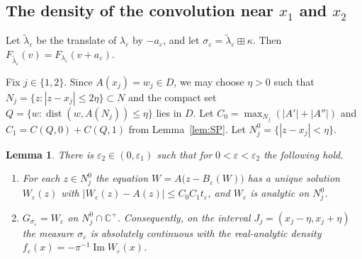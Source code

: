 \documentclass[11pt]{amsart}
\numberwithin{equation}{section}
\newtheorem{lemma}[theorem]{Lemma}
\theoremstyle{definition}
\theoremstyle{remark}
\newcommand{\Cp}{\mathbb C^{+}}
\newcommand{\dist}{\operatorname{dist}}
\renewcommand{\Im}{\operatorname{Im}}
\begin{document}
\subsection{\texorpdfstring{The density of the convolution near $x_1$ and $x_2$}{The density of the convolution near x1 and x2}}
Let $\tilde\lambda_\varepsilon$ be the translate of $\lambda_\varepsilon$ by $-a_\varepsilon$, and let $\sigma_\varepsilon=\tilde\lambda_\varepsilon\boxplus\kappa$. Then $F_{\tilde\lambda_\varepsilon}(v)=F_{\lambda_\varepsilon}(v+a_\varepsilon)$.

Fix $j\in\{1,2\}$. Since $A(x_j)=w_j\in D$, we may choose $\eta>0$ such that $N_j=\{z:|z-x_j|\le2\eta\}\subset N$ and the compact set $Q=\{w:\dist(w,A(N_j))\le\eta\}$ lies in $D$. Let $C_0=\max_{N_j}(|A'|+|A''|)$ and $C_1=C(Q,0)+C(Q,1)$ from Lemma~\ref{lem:SP}. Let $N_j^0=\{|z-x_j|<\eta\}$.

\begin{lemma}\label{lem:ident}
There is $\varepsilon_2\in(0,\varepsilon_1)$ such that for $0<\varepsilon<\varepsilon_2$ the following hold.
\begin{enumerate}
\item For each $z\in N_j^0$ the equation $W=A\bigl(z-B_\varepsilon(W)\bigr)$ has a unique solution $W_\varepsilon(z)$ with $|W_\varepsilon(z)-A(z)|\le C_0C_1t_\varepsilon$, and $W_\varepsilon$ is analytic on $N_j^0$.
\item $G_{\sigma_\varepsilon}=W_\varepsilon$ on $N_j^0\cap\Cp$. Consequently, on the interval $J_j=(x_j-\eta,x_j+\eta)$ the measure $\sigma_\varepsilon$ is absolutely continuous with the real-analytic density $f_\varepsilon(x)=-\pi^{-1}\Im W_\varepsilon(x)$.
\end{enumerate}
\end{lemma}
\end{document}
